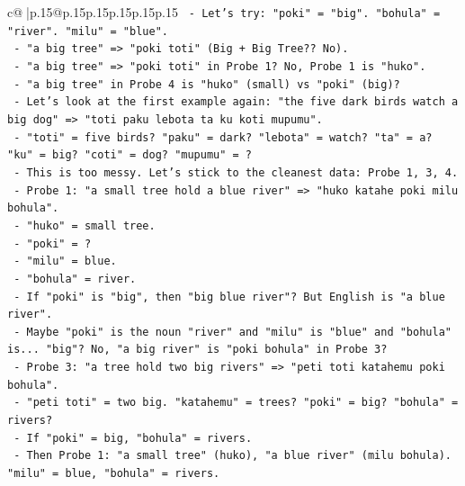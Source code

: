 \documentclass{article}
\begin{document}
{\begin{supertabular}{c@{$\;$}|p{.15\linewidth}@{}p{.15\linewidth}p{.15\linewidth}p{.15\linewidth}p{.15\linewidth}p{.15\linewidth}}
{{{\texttt{                    {-} Let's try: "poki" = "big". "bohula" = "river". "milu" = "blue".} \\
\texttt{                      {-} "a big tree" => "poki toti" (Big + Big Tree?? No).} \\
\texttt{                      {-} "a big tree" => "poki toti" in Probe 1? No, Probe 1 is "huko".} \\
\texttt{                      {-} "a big tree" in Probe 4 is "huko" (small) vs "poki" (big)?} \\
\texttt{                      {-} Let's look at the first example again: "the five dark birds watch a big dog" => "toti paku lebota ta ku koti mupumu".} \\
\texttt{                        {-} "toti" = five birds? "paku" = dark? "lebota" = watch? "ta" = a? "ku" = big? "coti" = dog? "mupumu" = ?} \\
\texttt{                        {-} This is too messy. Let's stick to the cleanest data: Probe 1, 3, 4.} \\
\texttt{                        {-} Probe 1: "a small tree hold a blue river" => "huko katahe poki milu bohula".} \\
\texttt{                          {-} "huko" = small tree.} \\
\texttt{                          {-} "poki" = ?} \\
\texttt{                          {-} "milu" = blue.} \\
\texttt{                          {-} "bohula" = river.} \\
\texttt{                          {-} If "poki" is "big", then "big blue river"? But English is "a blue river".} \\
\texttt{                          {-} Maybe "poki" is the noun "river" and "milu" is "blue" and "bohula" is... "big"? No, "a big river" is "poki bohula" in Probe 3?} \\
\texttt{                          {-} Probe 3: "a tree hold two big rivers" => "peti toti katahemu poki bohula".} \\
\texttt{                            {-} "peti toti" = two big. "katahemu" = trees? "poki" = big? "bohula" = rivers?} \\
\texttt{                            {-} If "poki" = big, "bohula" = rivers.} \\
\texttt{                            {-} Then Probe 1: "a small tree" (huko), "a blue river" (milu bohula). "milu" = blue, "bohula" = rivers.} \\
}}}
\end{supertabular}}
\end{document}
